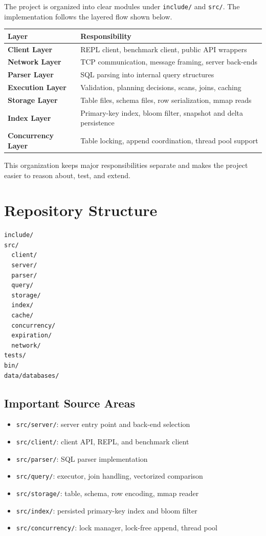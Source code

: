\documentclass[12pt,a4paper]{article}
\begin{document}
The project is organized into clear modules under \texttt{include/} and
\texttt{src/}. The implementation follows the layered flow shown below.

\begin{center}
\renewcommand{\arraystretch}{1.35}
\begin{tabular}{>{\bfseries}p{4.4cm}p{8.4cm}}
\toprule
Layer & Responsibility \\
\midrule
Client Layer & REPL client, benchmark client, public API wrappers \\
Network Layer & TCP communication, message framing, server back-ends \\
Parser Layer & SQL parsing into internal query structures \\
Execution Layer & Validation, planning decisions, scans, joins, caching \\
Storage Layer & Table files, schema files, row serialization, mmap reads \\
Index Layer & Primary-key index, bloom filter, snapshot and delta persistence \\
Concurrency Layer & Table locking, append coordination, thread pool support \\
\bottomrule
\end{tabular}
\end{center}

This organization keeps major responsibilities separate and makes the project
easier to reason about, test, and extend.

\section{Repository Structure}

\begin{lstlisting}[caption={Relevant repository structure}]
include/
src/
  client/
  server/
  parser/
  query/
  storage/
  index/
  cache/
  concurrency/
  expiration/
  network/
tests/
bin/
data/databases/
\end{lstlisting}

\subsection{Important Source Areas}

\begin{itemize}[leftmargin=1.8em]
  \item \texttt{src/server/}: server entry point and back-end selection
  \item \texttt{src/client/}: client API, REPL, and benchmark client
  \item \texttt{src/parser/}: SQL parser implementation
  \item \texttt{src/query/}: executor, join handling, vectorized comparison
  \item \texttt{src/storage/}: table, schema, row encoding, mmap reader
  \item \texttt{src/index/}: persisted primary-key index and bloom filter
  \item \texttt{src/concurrency/}: lock manager, lock-free append, thread pool
\end{itemize}
\end{document}
